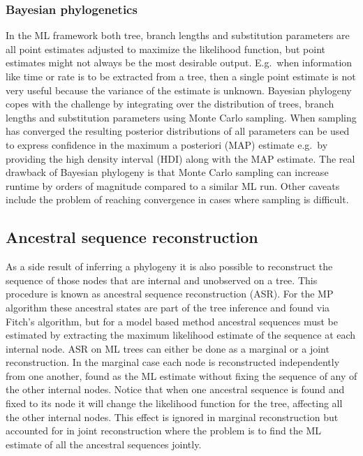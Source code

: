 \subsubsection{Bayesian phylogenetics}
In the ML framework both tree, branch lengths and substitution parameters are all point estimates adjusted to maximize the likelihood function, but point estimates might not always be the most desirable output.
E.g.\ when information like time or rate is to be extracted from a tree, then a single point estimate is not very useful because the variance of the estimate is unknown.
Bayesian phylogeny copes with the challenge by integrating over the distribution of trees, branch lengths and substitution parameters using Monte Carlo sampling.
When sampling has converged the resulting posterior distributions of all parameters can be used to express confidence in the maximum a posteriori (MAP) estimate e.g.\ by providing the high density interval (HDI) along with the MAP estimate.
The real drawback of Bayesian phylogeny is that Monte Carlo sampling can increase runtime by orders of magnitude compared to a similar ML run.
Other caveats include the problem of reaching convergence in cases where sampling is difficult.





\subsection{Ancestral sequence reconstruction}
As a side result of inferring a phylogeny it is also possible to reconstruct the sequence of those nodes that are internal and unobserved on a tree.
This procedure is known as ancestral sequence reconstruction (ASR).
For the MP algorithm these ancestral states are part of the tree inference and found via Fitch's algorithm, but for a model based method ancestral sequences must be estimated by extracting the maximum likelihood estimate of the sequence at each internal node.
ASR on ML trees can either be done as a marginal or a joint reconstruction.
In the marginal case each node is reconstructed independently from one another, found as the ML estimate without fixing the sequence of any of the other internal nodes.
Notice that when one ancestral sequence is found and fixed to its node it will change the likelihood function for the tree, affecting all the other internal nodes.
This effect is ignored in marginal reconstruction but accounted for in joint reconstruction where the problem is to find the ML estimate of all the ancestral sequences jointly.

